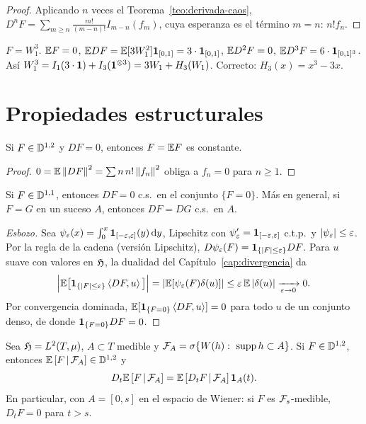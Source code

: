 \begin{proof}
Aplicando $n$ veces el Teorema~\ref{teo:derivada-caos}, $D^nF=\sum_{m\ge n}\frac{m!}{(m-n)!}I_{m-n}(f_m)$, cuya esperanza es el término $m=n$: $n!f_n$.
\end{proof}

\begin{ejemplo}
$F=W_1^3$. $\mathbb{E} F=0$, $\mathbb{E} DF=\mathbb{E}[3W_1^2]\mathbf{1}_{[0,1]}=3\cdot\mathbf{1}_{[0,1]}$, $\mathbb{E} D^2F=0$, $\mathbb{E} D^3F=6\cdot\mathbf{1}_{[0,1]^3}$.
Así $W_1^3=I_1(3\cdot\mathbf{1})+I_3(\mathbf{1}^{\otimes3})=3W_1+H_3(W_1)$. Correcto: $H_3(x)=x^3-3x$.
\end{ejemplo}

\section{Propiedades estructurales}

\begin{corolario}\label{cor:constante}
Si $F\in\mathbb{D}^{1,2}$ y $DF=0$, entonces $F=\mathbb{E} F$ es constante.
\end{corolario}

\begin{proof}
$0=\mathbb{E}\left\lVert DF\right\rVert^2=\sum n\,n!\left\lVert f_n\right\rVert^2$ obliga a $f_n=0$ para $n\ge1$.
\end{proof}

\begin{proposicion}[Localidad]\label{prop:localidad}
Si $F\in\mathbb{D}^{1,1}$, entonces $DF=0$ c.s.\ en el conjunto $\{F=0\}$.
Más en general, si $F=G$ en un suceso $A$, entonces $DF=DG$ c.s.\ en $A$.
\end{proposicion}

\begin{proof}[Esbozo]
Sea $\psi_\varepsilon(x)=\int_0^x\mathbf{1}_{[-\varepsilon,\varepsilon]}(y)\,\mathrm{d} y$, Lipschitz con $\psi_\varepsilon'=\mathbf{1}_{[-\varepsilon,\varepsilon]}$ c.t.p.\ y $\left\lvert \psi_\varepsilon\right\rvert\le\varepsilon$. Por la regla
de la cadena (versión Lipschitz), $D\psi_\varepsilon(F)=\mathbf{1}_{\{\left\lvert F\right\rvert\le\varepsilon\}}DF$. Para $u$ suave con valores en $\mathfrak{H}$, la
dualidad del Capítulo~\ref{cap:divergencia} da
\[
  \Big|\mathbb{E}\big[\mathbf{1}_{\{\left\lvert F\right\rvert\le\varepsilon\}}\left\langle DF, u\right\rangle\big]\Big|=\left\lvert \mathbb{E}[\psi_\varepsilon(F)\delta(u)]\right\rvert\le\varepsilon\,\mathbb{E}\left\lvert \delta(u)\right\rvert\xrightarrow[\varepsilon\to0]{}0.
\]
Por convergencia dominada, $\mathbb{E}[\mathbf{1}_{\{F=0\}}\left\langle DF, u\right\rangle]=0$ para todo $u$ de un conjunto denso, de donde
$\mathbf{1}_{\{F=0\}}DF=0$.
\end{proof}

\begin{proposicion}\label{prop:derivada-esp-cond}
Sea $\mathfrak{H}=L^2(T,\mu)$, $A\subset T$ medible
y $\F_A=\sigma\{W(h):\ \operatorname{supp}h\subset A\}$. Si $F\in\mathbb{D}^{1,2}$, entonces $\mathbb{E}\left[F\,\middle|\,\mathcal{F}_A\right]\in\mathbb{D}^{1,2}$ y
\[
  D_t\mathbb{E}\left[F\,\middle|\,\mathcal{F}_A\right]=\mathbb{E}\left[D_tF\,\middle|\,\mathcal{F}_A\right]\mathbf{1}_A(t).
\]
En particular, con $A=[0,s]$ en el espacio de Wiener: si $F$ es $\mathcal{F}_s$-medible, $D_tF=0$ para $t>s$.
\end{proposicion}

